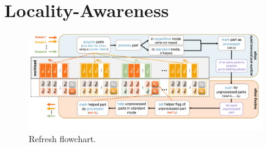 \chapter{Locality-Awareness}
\label{chapter:Locality-aware}

\begin{figure}[tb]
	\centering
	\includegraphics[width=0.9\textwidth]{figures/locality-aware/Refresh_ekosmas_2-Themis.pdf}	
	\vspace*{-0.8cm}
	\caption{Refresh flowchart.}
	\vspace*{-0.2cm}
	\label{fig:refresh:flowchart}
\end{figure}


